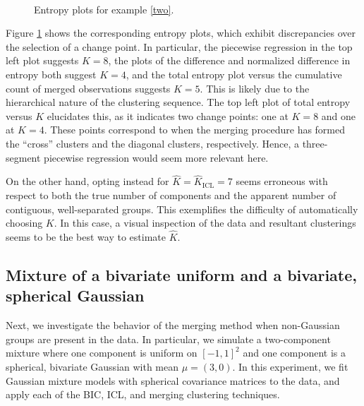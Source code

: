 \documentclass{uwstat572}
\newcommand*\estim[1]{\widehat{#1}}
\renewcommand\;{\,}
\begin{document}
\begin{figure}
\begin{center}
\\
\end{center}
\caption{Entropy plots for example \ref{two}.}
\label{Entropy2}
\end{figure}

Figure \ref{Entropy2} shows the corresponding entropy plots, which exhibit discrepancies over the selection of a change point.
In particular, the piecewise regression in the top left plot suggests $K = 8$, the plots of the difference and normalized difference in entropy both suggest $K = 4$, and the total entropy plot versus the cumulative count of merged observations suggests $K = 5$.
This is likely due to the hierarchical nature of the clustering sequence.
The top left plot of total entropy versus $K$ elucidates this, as it indicates two change points: one at $K = 8$ and one at $K = 4$.
These points correspond to when the merging procedure has formed the ``cross'' clusters and the diagonal clusters, respectively. 
Hence, a three-segment piecewise regression would seem more relevant here.

On the other hand, opting instead for $\estim K = \estim K_{\text{ICL}} = 7$ seems erroneous with respect to both the true number of components and the apparent number of contiguous, well-separated groups.
This exemplifies the difficulty of automatically choosing $K$.
In this case, a visual inspection of the data and resultant clusterings seems to be the best way to estimate $\estim K$.

\subsection{Mixture of a bivariate uniform and a bivariate, spherical Gaussian}\label{three}
Next, we investigate the behavior of the merging method when non-Gaussian groups are present in the data.
In particular, we simulate a two-component mixture where one component is uniform on $[-1, 1]^2$ and one component is a spherical, bivariate Gaussian with mean $\mu = (3, 0)$.
In this experiment, we fit Gaussian mixture models with spherical covariance matrices to the data, and apply each of the BIC, ICL, and merging clustering techniques.
\end{document}
